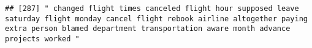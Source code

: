 \documentclass[
]{article}
\begin{document}
\begin{verbatim}
## [287] " changed flight times canceled flight hour supposed leave saturday flight monday cancel flight rebook airline altogether paying extra person blamed department transportation aware month advance projects worked "                                                                                                                                                                                                                                                                                                                                                                                                                                                                                                                                                                                                                                                                                                                                                                                                                                                                                                                                                                                                                                                                                                                                                                                                                                                                                                                                                                                                                                                                                                                                                                            

\end{verbatim}
\end{document}
